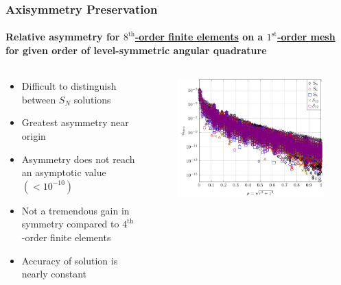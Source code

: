 \documentclass[compress,t]{beamer}
\begin{document}
\begin{frame}[t]
\frametitle{Axisymmetry Preservation}
\framesubtitle{Relative asymmetry for \underline{$8^\text{th}$-order finite elements} on a \underline{$1^\text{st}$-order mesh} for given order of level-symmetric angular quadrature}

\begin{columns}[T]

\begin{column}{0.4\textwidth}
\begin{itemize}
\item{Difficult to distinguish between $S_N$ solutions}
\item{Greatest asymmetry near origin}
\item{Asymmetry does not reach an asymptotic value $(<10^{-10})$}
\item{Not a tremendous gain in symmetry compared to $4^\text{th}$-order finite elements}
\item{Accuracy of solution is nearly constant}
\end{itemize}

\end{column}

\begin{column}{0.6\textwidth}
\begin{figure}
\flushright
\includegraphics[scale=0.6]{./graphics/RZASMMSLinearRhoBrunnerp8g1r2.pdf}
\end{figure}

\end{column}

\end{columns}

\end{frame}
\end{document}
